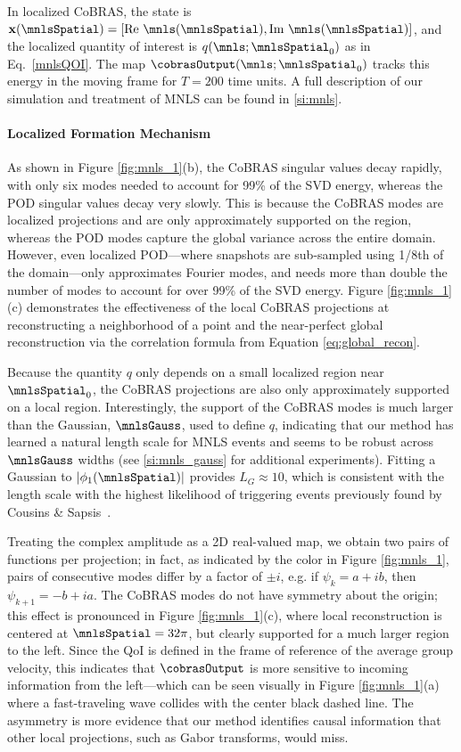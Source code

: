 \documentclass[twocolumn,10pt]{article}
\begin{document}
In localized CoBRAS, the state is $\mathbf x(\mnlsSpatial) = [\text{Re } \mnls(\mnlsSpatial), \text{Im } \mnls(\mnlsSpatial)]$, and the localized quantity of interest is $q(\mnls;\mnlsSpatial_0)$ as in Eq.~\ref{mnlsQOI}. The map $\cobrasOutput(\mnls; \mnlsSpatial_0)$ tracks this energy in the moving frame for $T=200$ time units. 
A full description of our simulation and treatment of MNLS can be found in  \ref{si:mnls}. 

\paragraph{Localized Formation Mechanism}
As shown in Figure \ref{fig:mnls_1}(b), the CoBRAS singular values decay rapidly, with only six modes needed to account for 99\% of the SVD energy, whereas the POD singular values decay very slowly. 
This is because the CoBRAS modes are localized projections and are only approximately supported on the region, whereas the POD modes capture the global variance across the entire domain. However, even localized POD---where snapshots are sub-sampled using 1/8th of the domain---only approximates Fourier modes, and needs more than double the number of modes to account for over 99\% of the SVD energy. Figure \ref{fig:mnls_1}(c) demonstrates the effectiveness of the local CoBRAS projections at reconstructing a neighborhood of a point and the near-perfect global reconstruction via the correlation formula from Equation \ref{eq:global_recon}. 

Because the quantity $q$ only depends on a small localized region near $\mnlsSpatial_0$, the CoBRAS projections are also only approximately supported on a local region. Interestingly, the support of the CoBRAS modes is much larger than the Gaussian, $\mnlsGauss$, used to define $q$, indicating that {our method has learned a natural length scale for MNLS events} and seems to be robust across $\mnlsGauss$ widths (see \ref{si:mnls_gauss} for additional experiments). Fitting a Gaussian to  $|\phi_1(\mnlsSpatial)|$ provides $L_G \approx 10$, which is consistent with the length scale with the highest likelihood of triggering events previously found by Cousins \& Sapsis~\cite{cousins2016a}. 

%

Treating the complex amplitude as a 2D real-valued map, we obtain two pairs of functions per projection; in fact, as indicated by the color in Figure \ref{fig:mnls_1}, pairs of consecutive modes differ by a factor of  $\pm i$, e.g. if $\psi_k = a +ib$, then $\psi_{k+1} = -b  + ia$. 
%
The CoBRAS modes do not have symmetry about the origin; this effect is pronounced in Figure \ref{fig:mnls_1}(c), where local reconstruction is centered at $\mnlsSpatial = 32\pi$, but clearly supported for a much larger region to the left.
%
Since the QoI is defined in the frame of reference of the average group velocity, this indicates that $\cobrasOutput$ is more sensitive to incoming information from the left---which can be seen visually in Figure \ref{fig:mnls_1}(a) where a fast-traveling wave collides with the center black dashed line. 
%
The asymmetry is more evidence that {our method identifies causal information} that other local projections, such as Gabor transforms, would miss.
\end{document}

